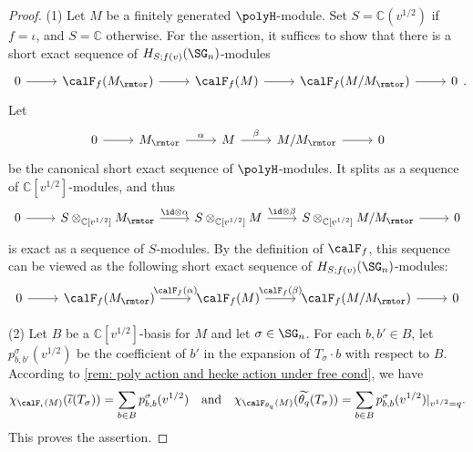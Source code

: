 \documentclass[12pt, reqno]{amsart}
\theoremstyle{plain}
\theoremstyle{definition}
\numberwithin{equation}{section}
\numberwithin{figure}{section}
\numberwithin{table}{section}
\def\C{\mathbb C}
\begin{document}
\begin{proof}
(1) 
Let $M$ be a finitely generated $\polyH$-module.
Set $S = \C(v^{1/2})$ if $f = \iota$, and $S = \C$ otherwise.
For the assertion, it suffices to show that there is a short exact  sequence of $H_{S;f(v)}(\SG_n)$-modules 
\begin{equation*}
\begin{tikzcd}
0 \arrow[r] & \calF_f(M_{\rmtor}) \arrow[r] & \calF_f(M) \arrow[r] & \calF_f(M/M_{\rmtor}) \arrow[r] & 0
\end{tikzcd}.
\end{equation*}
Let \[
\begin{tikzcd}
0 \arrow[r] & M_{\rmtor} \arrow[r, "\alpha"] & M \arrow[r, "\beta"] & M/M_{\rmtor} \arrow[r] & 0
\end{tikzcd}
\]
be the canonical short exact sequence of $\polyH$-modules.
It splits as a sequence of $\C[v^{1/2}]$-modules, and thus
\[
\begin{tikzcd}
0 \arrow[r] & S \otimes_{\C[v^{1/2}]} M_{\rmtor} \arrow[r, "\id \otimes \alpha"] & S \otimes_{\C[v^{1/2}]} M \arrow[r, "\id \otimes \beta"] & S \otimes_{\C[v^{1/2}]} M/M_{\rmtor} \arrow[r] & 0
\end{tikzcd}
\]
is  exact as a sequence of $S$-modules.
By the definition of $\calF_f$, this sequence can be viewed as the following short exact sequence of $H_{S; f(v)}(\SG_n)$-modules:
\[
\begin{tikzcd}
0 \arrow[r] & \calF_f(M_{\rmtor}) \arrow[r, "\calF_f(\alpha)"] & \calF_f(M) \arrow[r, "\calF_f(\beta)"] & \calF_f(M/M_{\rmtor}) \arrow[r] & 0
\end{tikzcd}
\]
\medskip

(2) 
Let $B$ be a $\C[v^{1/2}]$-basis for $M$ and let $\sigma \in \SG_n$.
For each $b, b' \in B$, let $p^{\sigma}_{b,b'}(v^{1/2})$ be the  coefficient of $b'$ in the expansion of $T_\sigma \cdot b$ with respect to  $B$.
According to \cref{rem: poly action and hecke action under free cond}, we have 
\begin{align*}
\chi_{\calF_{\iota}(M)}(\widetilde{\iota}(T_\sigma)) = \sum_{b \in B} p^{\sigma}_{b,b}(v^{1/2})\quad\text{and}\quad \chi_{\calF_{\theta_q}(M)}(\widetilde{\theta_q}(T_\sigma)) = \sum_{b \in B} p^\sigma_{b,b}(v^{1/2})|_{v^{1/2} = q}.
\end{align*}
This proves the assertion.
\end{proof}
\end{document}
